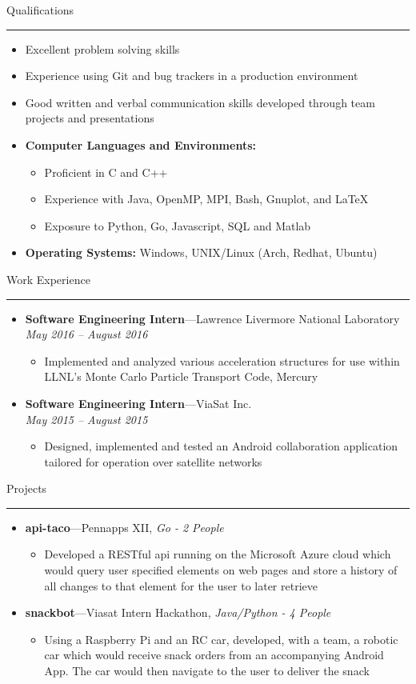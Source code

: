 \documentclass[10pt,oneside]{article}
\newcommand{\sectitle}[1]{
	\begin{flushleft}{\fontfamily{phv}\selectfont\Large#1}\end{flushleft}
}
\newenvironment{ressection}[1]{
	\vspace{2pt}
	\sectitle{#1}
	\vspace{-10pt}\rule{\textwidth}{0.5pt}
	\vspace{-10pt}
	\begin{itemize}
	\vspace{3pt}
}{
	\end{itemize}
}
\newcommand{\resitem}[1]{
	\vspace{-4pt}
	\item \begin{flushleft} #1 \end{flushleft}
}
\newcommand{\ressubitem}[1]{
	\vspace{-1pt}
	\item \begin{flushleft} #1 \end{flushleft}
}
\newcommand{\resbigitemline}[3]{
	\vspace{-5pt}
	\item
	\textbf{#1}---#2, 
	\textit{#3}
}
\newcommand{\resbigitem}[3]{
	\vspace{-5pt}
	\item
	\textbf{#1}---#2 \\
	\textit{#3}
}
\newenvironment{ressubsec}[3]{
	\resbigitem{#1}{#2}{#3}
	\vspace{-2pt}
	\begin{itemize}
}{
	\end{itemize}
}
\newenvironment{ressubsecline}[3]{
	\resbigitemline{#1}{#2}{#3}
	\vspace{-2pt}
	\begin{itemize}
}{
	\end{itemize}
}
\newenvironment{reslist}[1]{
	\resitem{\textbf{#1}}
	\vspace{-5pt}
	\begin{itemize}
}{
	\end{itemize}
}
\begin{document}
\begin{ressection}{Qualifications}
	\resitem{Excellent problem solving skills}

	\resitem{Experience using Git and bug trackers in a production environment}

	\resitem{Good written and verbal communication skills developed through team projects and presentations}

	\begin{reslist}{Computer Languages and Environments:}
		\ressubitem{Proficient in C and C++}
		\ressubitem{Experience with Java, OpenMP, MPI, Bash, Gnuplot, and LaTeX}
		\ressubitem{Exposure to Python, Go, Javascript, SQL and Matlab}
	\end{reslist}

	\resitem{\textbf{Operating Systems:} Windows,
	UNIX/Linux (Arch, Redhat, Ubuntu)}

\end{ressection}


\begin{ressection}{Work Experience}
  \begin{ressubsec}{Software Engineering Intern}{Lawrence Livermore National Laboratory}{May 2016 -- August 2016}
    \ressubitem{Implemented and analyzed various acceleration structures for use within LLNL's Monte Carlo Particle Transport Code, Mercury}
  \end{ressubsec}
	
  \begin{ressubsec}{Software Engineering Intern}{ViaSat Inc.}{May 2015 -- August 2015}
    \ressubitem{Designed, implemented and tested an Android collaboration application tailored for operation over satellite networks}
  \end{ressubsec}

\end{ressection}

\begin{ressection}{Projects}
	\begin{ressubsecline}{api-taco}{Pennapps XII}{Go - 2 People}
		\ressubitem{Developed a RESTful api running on the Microsoft Azure cloud which would query user specified
		elements on web pages and store a history of all changes to that element for the user to later retrieve}
	\end{ressubsecline}
	\begin{ressubsecline}{snackbot}{Viasat Intern Hackathon}{Java/Python - 4 People}
		\ressubitem{Using a Raspberry Pi and an RC car, developed, with a team, a robotic car which would receive snack
		orders from an accompanying Android App. The car would then navigate to the user to deliver the snack}
	\end{ressubsecline}
\end{ressection}
\end{document}
